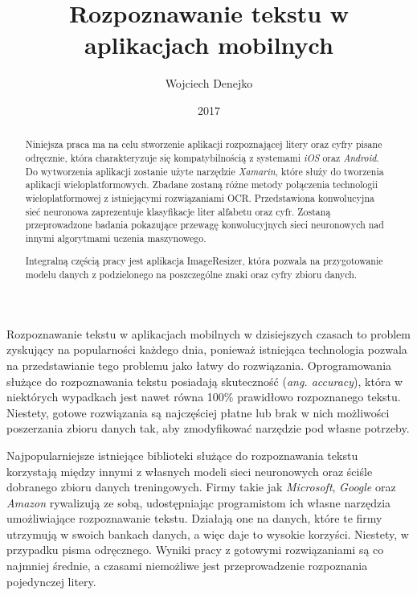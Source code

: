 \documentclass[brudnopis]{xmgr}
\author   {Wojciech Denejko}
\title    {Rozpoznawanie tekstu w aplikacjach mobilnych}
\date     {2017}
\begin{document}
\begin{abstract}
  Niniejsza praca ma na celu stworzenie aplikacji rozpoznającej litery oraz cyfry pisane odręcznie, która charakteryzuje się kompatybilnością z systemami \emph{iOS} oraz \emph{Android}. Do wytworzenia aplikacji zostanie użyte narzędzie \emph{Xamarin}, które służy do tworzenia aplikacji wieloplatformowych. Zbadane zostaną różne metody połączenia technologii wieloplatformowej z istniejącymi rozwiązaniami OCR. Przedstawiona konwolucyjna sieć neuronowa zaprezentuje klasyfikacje liter alfabetu oraz cyfr. Zostaną przeprowadzone badania pokazujące przewagę konwolucyjnych sieci neuronowych nad innymi algorytmami uczenia maszynowego.
  
  Integralną częścią pracy jest aplikacja ImageResizer, która pozwala na przygotowanie modelu danych z podzielonego na poszczególne znaki oraz cyfry zbioru danych.
  
\end{abstract}


\maketitle

\introduction
	Rozpoznawanie tekstu w aplikacjach mobilnych w dzisiejszych czasach to problem zyskujący na popularności każdego dnia, ponieważ istniejąca technologia pozwala na przedstawianie tego problemu jako łatwy do rozwiązania. Oprogramowania służące do rozpoznawania tekstu posiadają skuteczność (\emph{ang. accuracy}), która w niektórych wypadkach jest nawet równa 100\% prawidłowo rozpoznanego tekstu. Niestety, gotowe rozwiązania są najczęściej płatne lub brak w nich możliwości poszerzania zbioru danych tak, aby zmodyfikować narzędzie pod własne potrzeby.
	
	Najpopularniejsze istniejące biblioteki służące do rozpoznawania tekstu korzystają między innymi z własnych modeli sieci neuronowych oraz ściśle dobranego zbioru danych treningowych. Firmy takie jak \emph{Microsoft}, \emph{Google} oraz \emph{Amazon} rywalizują ze sobą, udostępniając programistom ich własne narzędzia umożliwiające rozpoznawanie tekstu. Działają one na danych, które te firmy utrzymują w swoich bankach danych, a więc daje to wysokie korzyści. Niestety, w przypadku pisma odręcznego. Wyniki pracy z gotowymi rozwiązaniami są co najmniej średnie, a czasami niemożliwe jest przeprowadzenie rozpoznania pojedynczej litery.
	
\end{document}
